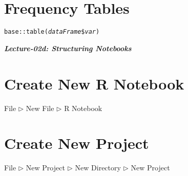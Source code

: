 \documentclass{tufte-handout}
\begin{document}
\vspace{5mm}
\section{Frequency Tables}
\texttt{base::}{\color{red}\texttt{table}}\texttt{(\textit{dataFrame}\$\textit{var})}

\newpage
\begin{center}
{\Large\textit{\textbf{Lecture-02d: Structuring Notebooks}}}
\end{center}

\section{Create New R Notebook}
\textsf{File $\triangleright$ New File $\triangleright$} {\color{red}\textsf{R Notebook}}

\vspace{5mm}
\section{Create New Project}
\textsf{File $\triangleright$} {\color{red}\textsf{New Project}} \textsf{$\triangleright$ New Directory $\triangleright$ New Project}

\end{document}
